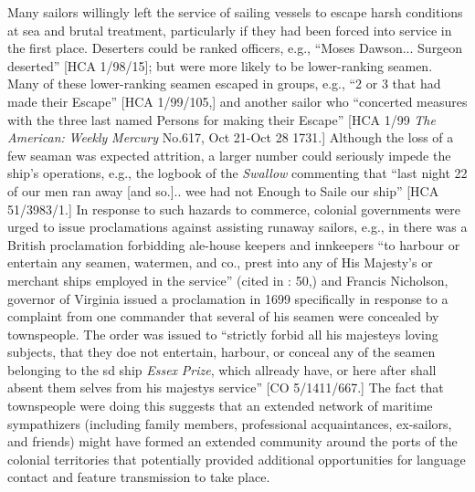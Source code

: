   Many sailors willingly left the service of sailing vessels to escape harsh conditions at sea and brutal treatment, particularly if they had been forced into service in the first place. Deserters could be ranked officers, e.g., “Moses Dawson... Surgeon deserted” [HCA 1/98/15]; but were more likely to be lower-ranking seamen. Many of these lower-ranking seamen escaped in groups, e.g., “2 or 3 that had made their Escape” [HCA 1/99/105,] and another sailor who “concerted measures with the three last named Persons for making their Escape” [HCA 1/99 \textit{The} \textit{American:} \textit{Weekly} \textit{Mercury} No.617, Oct 21-Oct 28 1731.] Although the loss of a few seaman was expected attrition, a larger number could seriously impede the ship’s operations, e.g., the logbook of the \textit{Swallow} commenting that “last night 22 of our men ran away [and so.]..  wee had not Enough to Saile our ship” [HCA 51/3983/1.] In response to such hazards to commerce, colonial governments were urged to issue proclamations against  assisting runaway sailors, e.g., in \citealt{April1643} there was a British proclamation forbidding ale-house keepers and innkeepers “to harbour or entertain any seamen, watermen, and co., prest into any of His Majesty’s or merchant ships employed in the service” (cited in \citealt{Lavery2009}: 50,) and Francis Nicholson, governor of Virginia issued a proclamation in 1699 specifically in response to a complaint from one commander that several of his seamen were concealed by townspeople. The order was issued to “strictly forbid all his majesteys loving subjects, that they doe not entertain, harbour, or conceal any of the seamen belonging to the sd ship \textit{Essex} \textit{Prize}, which allready have, or here after shall absent them selves from his majestys service” [CO 5/1411/667.] The fact that townspeople were doing this suggests that an extended network of maritime sympathizers (including family members, professional acquaintances, ex-sailors, and friends) might have formed an extended community around the ports of the colonial territories that potentially provided additional opportunities for language contact and feature transmission to take place. 

